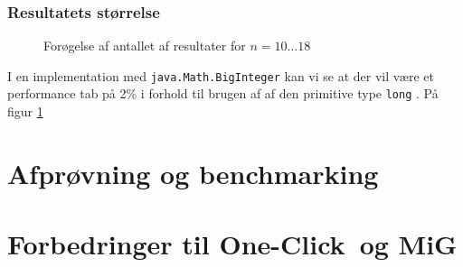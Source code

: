 \documentclass[pdf,draft,a4paper,11pt]{article}
\newcommand{\mig}{MiG}
\newcommand{\oc}{One-Click}
\begin{document}
\subsubsection{Resultatets størrelse}

\begin{figure}
\caption{Forøgelse af antallet af resultater for $n=10\ldots18$}
\label{solrelativecount}
\end{figure}


I en implementation med \texttt{java.Math.BigInteger} kan vi se at der vil være et performance tab på 2\% i forhold til brugen af af den primitive type \texttt{long} . 
På figur \ref{solrelativecount}


\section{Afprøvning og benchmarking}



\section{Forbedringer til \oc\ og \mig}
%
\end{document}
